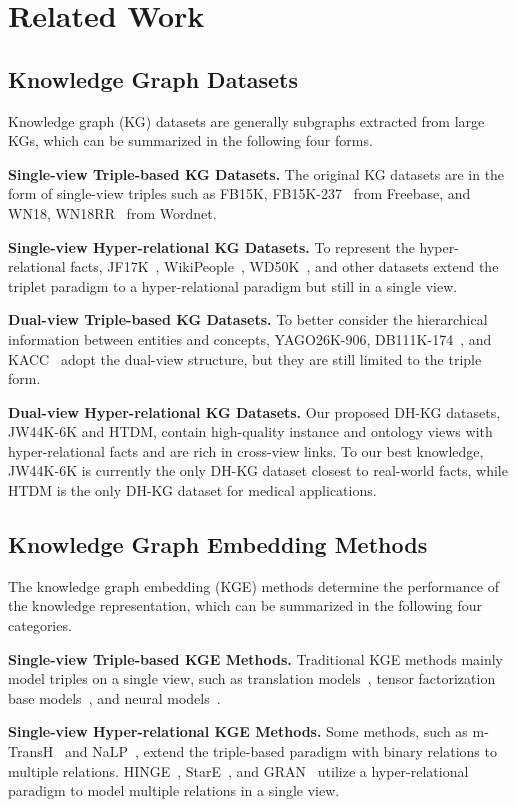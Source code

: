 \documentclass[letterpaper]{article} \usepackage{aaai23}  \usepackage{times}  \usepackage{helvet}  \usepackage{courier}  \usepackage[hyphens]{url}  \usepackage{graphicx} \urlstyle{rm} \def\UrlFont{\rm}  \usepackage{natbib}  \usepackage{caption} \frenchspacing  \setlength{\pdfpagewidth}{8.5in}  \setlength{\pdfpageheight}{11in}  \usepackage{times}
\begin{document}
\section{Related Work}
\label{s2}
\subsection{Knowledge Graph Datasets}
Knowledge graph (KG) datasets are generally subgraphs extracted from large KGs, which can be summarized in the following four forms.

{\bf Single-view Triple-based KG Datasets. }
The original KG datasets are in the form of single-view triples such as FB15K, FB15K-237~\citep{TransE} from Freebase, and WN18,  WN18RR~\citep{TransE} from Wordnet.

{\bf Single-view Hyper-relational KG Datasets. }
To represent the hyper-relational facts, JF17K~\citep{m-TransH}, WikiPeople~\citep{NaLP}, WD50K~\citep{StarE}, and other datasets extend the triplet paradigm to a hyper-relational paradigm but still in a single view.

{\bf Dual-view Triple-based KG Datasets. }
To better consider the hierarchical information between entities and concepts, YAGO26K-906, DB111K-174~\citep{JOIE}, and KACC~\citep{KACC} adopt the dual-view structure, but they are still limited to the triple form.

{\bf Dual-view Hyper-relational KG Datasets. }
Our proposed DH-KG datasets, JW44K-6K and HTDM, contain high-quality instance and ontology views with hyper-relational facts and are rich in cross-view links. To our best knowledge, JW44K-6K is currently the only DH-KG dataset closest to real-world facts, while HTDM is the only DH-KG dataset for medical applications.

\subsection{Knowledge Graph Embedding Methods}
The knowledge graph embedding (KGE) methods determine the performance of the knowledge representation, which can be summarized in the following four categories.

{\bf Single-view Triple-based KGE Methods. }
Traditional KGE methods mainly model triples on a single view, such as translation models~\citep{TransE, RotatE}, tensor factorization base models~\citep{TuckER}, and neural models~\citep{ConvE}.

{\bf Single-view Hyper-relational KGE Methods. }
Some methods, such as m-TransH~\citep{m-TransH} and NaLP~\citep{NaLP}, extend the triple-based paradigm with binary relations to multiple relations. HINGE~\citep{HINGE}, StarE~\citep{StarE}, and GRAN~\citep{GRAN} utilize a hyper-relational paradigm to model multiple relations in a single view.
\end{document}

